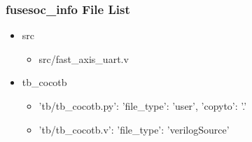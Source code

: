 \subsubsection{fusesoc\_info File List}
\begin{itemize}
\item src
	\begin{itemize}
	\item src/fast\_axis\_uart.v
	\end{itemize}
\item tb\_cocotb
	\begin{itemize}
	\item {'tb/tb\_cocotb.py': {'file\_type': 'user', 'copyto': '.'}}
	\item {'tb/tb\_cocotb.v': {'file\_type': 'verilogSource'}}
	\end{itemize}
\end{itemize}
